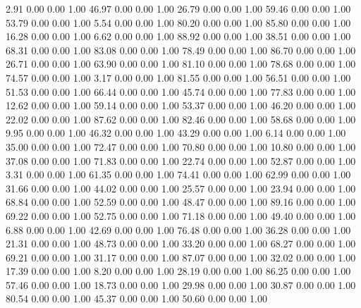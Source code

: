     2.91   0.00   0.00   1.00
   46.97   0.00   0.00   1.00
   26.79   0.00   0.00   1.00
   59.46   0.00   0.00   1.00
   53.79   0.00   0.00   1.00
    5.54   0.00   0.00   1.00
   80.20   0.00   0.00   1.00
   85.80   0.00   0.00   1.00
   16.28   0.00   0.00   1.00
    6.62   0.00   0.00   1.00
   88.92   0.00   0.00   1.00
   38.51   0.00   0.00   1.00
   68.31   0.00   0.00   1.00
   83.08   0.00   0.00   1.00
   78.49   0.00   0.00   1.00
   86.70   0.00   0.00   1.00
   26.71   0.00   0.00   1.00
   63.90   0.00   0.00   1.00
   81.10   0.00   0.00   1.00
   78.68   0.00   0.00   1.00
   74.57   0.00   0.00   1.00
    3.17   0.00   0.00   1.00
   81.55   0.00   0.00   1.00
   56.51   0.00   0.00   1.00
   51.53   0.00   0.00   1.00
   66.44   0.00   0.00   1.00
   45.74   0.00   0.00   1.00
   77.83   0.00   0.00   1.00
   12.62   0.00   0.00   1.00
   59.14   0.00   0.00   1.00
   53.37   0.00   0.00   1.00
   46.20   0.00   0.00   1.00
   22.02   0.00   0.00   1.00
   87.62   0.00   0.00   1.00
   82.46   0.00   0.00   1.00
   58.68   0.00   0.00   1.00
    9.95   0.00   0.00   1.00
   46.32   0.00   0.00   1.00
   43.29   0.00   0.00   1.00
    6.14   0.00   0.00   1.00
   35.00   0.00   0.00   1.00
   72.47   0.00   0.00   1.00
   70.80   0.00   0.00   1.00
   10.80   0.00   0.00   1.00
   37.08   0.00   0.00   1.00
   71.83   0.00   0.00   1.00
   22.74   0.00   0.00   1.00
   52.87   0.00   0.00   1.00
    3.31   0.00   0.00   1.00
   61.35   0.00   0.00   1.00
   74.41   0.00   0.00   1.00
   62.99   0.00   0.00   1.00
   31.66   0.00   0.00   1.00
   44.02   0.00   0.00   1.00
   25.57   0.00   0.00   1.00
   23.94   0.00   0.00   1.00
   68.84   0.00   0.00   1.00
   52.59   0.00   0.00   1.00
   48.47   0.00   0.00   1.00
   89.16   0.00   0.00   1.00
   69.22   0.00   0.00   1.00
   52.75   0.00   0.00   1.00
   71.18   0.00   0.00   1.00
   49.40   0.00   0.00   1.00
    6.88   0.00   0.00   1.00
   42.69   0.00   0.00   1.00
   76.48   0.00   0.00   1.00
   36.28   0.00   0.00   1.00
   21.31   0.00   0.00   1.00
   48.73   0.00   0.00   1.00
   33.20   0.00   0.00   1.00
   68.27   0.00   0.00   1.00
   69.21   0.00   0.00   1.00
   31.17   0.00   0.00   1.00
   87.07   0.00   0.00   1.00
   32.02   0.00   0.00   1.00
   17.39   0.00   0.00   1.00
    8.20   0.00   0.00   1.00
   28.19   0.00   0.00   1.00
   86.25   0.00   0.00   1.00
   57.46   0.00   0.00   1.00
   18.73   0.00   0.00   1.00
   29.98   0.00   0.00   1.00
   30.87   0.00   0.00   1.00
   80.54   0.00   0.00   1.00
   45.37   0.00   0.00   1.00
   50.60   0.00   0.00   1.00

